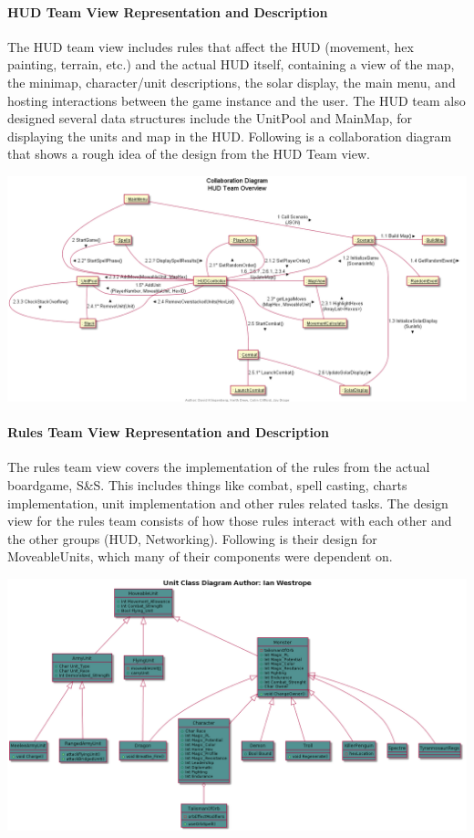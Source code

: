 \documentclass[12pt,a4paper,titlepage]{article}
\begin{document}
\paragraph{HUD Team View Representation and Description}
The HUD team view includes rules that affect the HUD (movement, hex painting, terrain, etc.) and the actual HUD itself, containing a view of the map, the minimap, character/unit descriptions, the solar display, the main menu, and hosting interactions between the game instance and the user. The HUD team also designed several data structures include the UnitPool and MainMap, for displaying the units and map in the HUD. Following is a collaboration diagram that shows a rough idea of the design from the HUD Team view.
\begin{center}
\includegraphics[width=\linewidth]{HUDTeamCollab.png}
\end{center}
\paragraph{Rules Team View Representation and Description}
The rules team view covers the implementation of the rules from the actual boardgame, S\&S. This includes things like combat, spell casting, charts implementation, unit implementation and other rules related tasks. The design view for the rules team consists of how those rules interact with each other and the other groups (HUD, Networking). Following is their design for MoveableUnits, which many of their components were dependent on.
\begin{center}
\includegraphics[width=\linewidth]{units.png}
\end{center}
\end{document}
